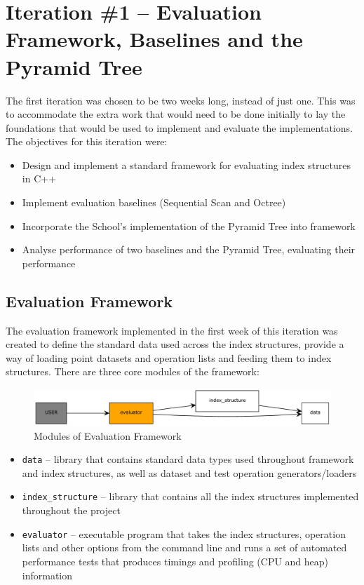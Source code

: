 \section{Iteration \#1 -- Evaluation Framework, Baselines and the Pyramid Tree}

The first iteration was chosen to be two weeks long, instead of just one. This was to accommodate the extra work that would need to be done initially to lay the foundations that would be used to implement and evaluate the implementations. The objectives for this iteration were:
\begin{itemize}
	\item Design and implement a standard framework for evaluating index structures in C++
	\item Implement evaluation baselines (Sequential Scan and Octree)
	\item Incorporate the School's implementation of the Pyramid Tree into framework
	\item Analyse performance of two baselines and the Pyramid Tree, evaluating their performance
\end{itemize}

\subsection{Evaluation Framework}

The evaluation framework implemented in the first week of this iteration was created to define the standard data used across the index structures, provide a way of loading point datasets and operation lists and feeding them to index structures. There are three core modules of the framework:

\begin{figure}
	\vspace{-40pt}
	\begin{center}
		\includegraphics[scale=0.4]{figures/evaluation_framework.pdf}
	\end{center}
	\vspace{-20pt}
	\caption{Modules of Evaluation Framework}
	\label{fig:evaluation-framework}
\end{figure}

\begin{itemize}
	\item \texttt{data} -- library that contains standard data types used throughout framework and index structures, as well as dataset and test operation generators/loaders
	\item \texttt{index\_structure} -- library that contains all the index structures implemented throughout the project
	\item \texttt{evaluator} -- executable program that takes the index structures, operation lists and other options from the command line and runs a set of automated performance tests that produces timings and profiling (CPU and heap) information
\end{itemize}

